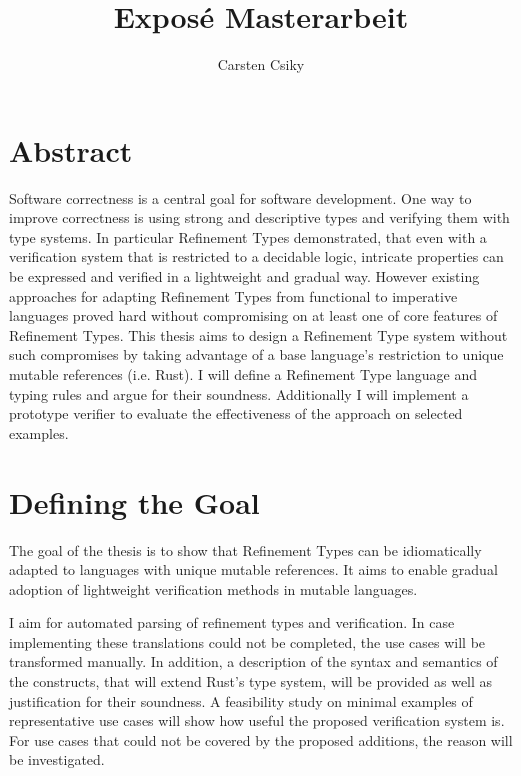 \documentclass[11pt]{article}
\title{\textbf{Exposé Masterarbeit}}
\author{Carsten Csiky}
\date{}
\begin{document}
\maketitle

\section{Abstract}


Software correctness is a central goal for software development. 
One way to improve correctness is using strong and descriptive types and verifying them with type systems.
In particular Refinement Types demonstrated, that even with a verification system that is restricted to a decidable logic, intricate properties can be expressed and verified in a lightweight and gradual way.
However existing approaches for adapting Refinement Types from functional to imperative languages proved hard without compromising on at least one of core features of Refinement Types.
This thesis aims to design a Refinement Type system without such compromises by taking advantage of a base language's restriction to unique mutable references (i.e. Rust). 
I will define a Refinement Type language and typing rules and argue for their soundness. Additionally I will implement a prototype verifier to evaluate the effectiveness of the approach on selected examples.



\section{Defining the Goal}

The goal of the thesis is to show that Refinement Types can be idiomatically adapted to languages with unique mutable references. It aims to enable gradual adoption of lightweight verification methods in mutable languages.

I aim for automated parsing of refinement types and verification. 
In case implementing these translations could not be completed, the use cases will be transformed manually.
In addition, a description of the syntax and semantics of the constructs, that will extend Rust's type system, will be provided as well as justification for their soundness. A feasibility study on minimal examples of representative use cases will show how useful the proposed verification system is. For use cases that could not be covered by the proposed additions, the reason will be investigated.
\end{document}
